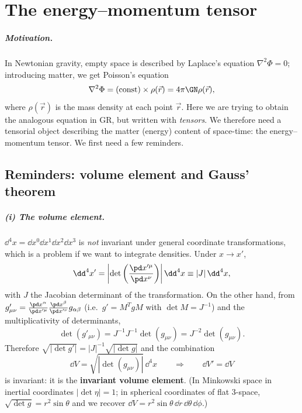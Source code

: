 \chapter{The energy--momentum tensor}\label{ch:emt}

\paragraph{Motivation.} In Newtonian gravity, empty space is described by Laplace's equation $\nabla^2\Phi=0$; introducing matter, we get Poisson's equation
\[
  \nabla^2\Phi=(\text{const})\times\rho(\vec r)=4\pi\GN\rho(\vec r),
\]
where $\rho(\vec r)$ is the mass density at each point $\vec r$. Here we are trying to obtain the analogous equation in GR, but written with \emph{tensors}. We therefore need a tensorial object describing the matter (energy) content of space-time: the energy--momentum tensor. We first need a few reminders.

\section{Reminders: volume element and Gauss' theorem}

\paragraph{(i) The volume element.} $\dd^4x=\dd x^0\dd x^1\dd x^2\dd x^3$ is \emph{not} invariant under general coordinate transformations, which is a problem if we want to integrate densities. Under $x\to x'$,
\begin{equation}
  \dd^4x'=\left|\det\left(\frac{\pd x'^\mu}{\pd x^\nu}\right)\right|\dd^4x\equiv|J|\,\dd^4x ,
\end{equation}
with $J$ the Jacobian determinant of the transformation. On the other hand, from $g'_{\mu\nu}=\frac{\pd x^\alpha}{\pd x'^\mu}\frac{\pd x^\beta}{\pd x'^\nu}g_{\alpha\beta}$ (i.e.\ $g'=M^TgM$ with $\det M=J^{-1}$) and the multiplicativity of determinants,
\begin{equation}
  \det(g'_{\mu\nu})=J^{-1}J^{-1}\det(g_{\mu\nu})=J^{-2}\det(g_{\mu\nu}).
\end{equation}
Therefore $\sqrt{|\det g'|}=|J|^{-1}\sqrt{|\det g|}$ and the combination
\begin{equation}
  \boxed{\dd V=\sqrt{|\det(g_{\mu\nu})|}\,\dd^4x}\qquad\Longrightarrow\qquad\dd V'=\dd V
\end{equation}
is invariant: it is the \textbf{invariant volume element}. (In Minkowski space in inertial coordinates $|\det\eta|=1$; in spherical coordinates of flat 3-space, $\sqrt{\det g}=r^2\sin\theta$ and we recover $\dd V=r^2\sin\theta\,\dd r\,\dd\theta\,\dd\phi$.)

